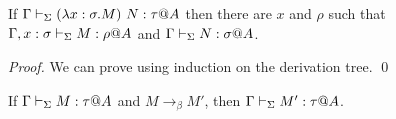 \begin{lemma}
	\begin{item}
	      \item If $\G \V (\lambda x:\sigma.M)\ N: \tau@A$ then there are $x$ and $\rho$ such that
	      $\Gamma, x:\sigma \vdash_\Sigma M : \rho @A$ and $\Gamma \vdash_\Sigma N:\sigma @ A$.
	\end{item}
\end{lemma}

\begin{proof}
	We can prove using induction on the derivation tree.
\qed\end{proof}
	
\begin{theorem}
	If $\G\V M:\tau@A$ and $M \longrightarrow_{\beta} M'$, then $\G\V M':\tau@A$.
\end{theorem}
	
